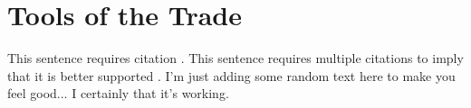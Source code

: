 
\section{Tools of the Trade}
\label{sec:Methods_Tools_of_the_Trade}

This sentence requires citation \cite{Devlin2019}. This sentence requires multiple citations to imply that it is better supported \citep{Kim2016,Rajpurkar2016}. I'm just adding some random text here to make you feel good... I certainly that it's working.

\endgroup